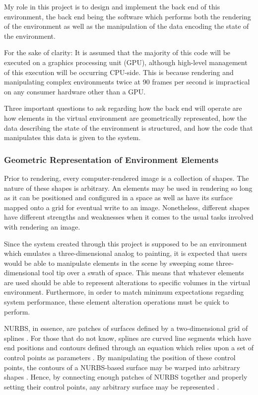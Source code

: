 \documentclass[onecolumn, draftclsnofoot,10pt, compsoc]{IEEEtran}
\newcounter{threesection}[subsubsection]
\begin{document}
My role in this project is to design and implement the back end of this environment, the back end being the software which performs both the rendering of the environment as well as the manipulation of the data encoding the state of the environment.

For the sake of clarity: It is assumed that the majority of this code will be executed on a graphics processing unit (GPU), although high-level management of this execution will be occurring CPU-side.
This is because rendering and manipulating complex environments twice at 90 frames per second is impractical on any consumer hardware other than a GPU.

Three important questions to ask regarding how the back end will operate are how elements in the virtual environment are geometrically represented, how the data describing the state of the environment is structured, and how the code that manipulates this data is given to the system.


\subsubsection{Geometric Representation of Environment Elements}

Prior to rendering, every computer-rendered image is a collection of shapes.
The nature of these shapes is arbitrary.
An elements may be used in rendering so long as it can be positioned and configured in a space as well as have its surface mapped onto a grid for eventual write to an image.
Nonetheless, different shapes have different strengths and weaknesses when it comes to the usual tasks involved with rendering an image.


Since the system created through this project is supposed to be an environment which emulates a three-dimensional analog to painting, it is expected that users would be able to manipulate elements in the scene by sweeping some three-dimensional tool tip over a swath of space. This means that whatever elements are used should be able to represent alterations to specific volumes in the virtual environment. Furthermore, in order to match minimum expectations regarding system performance, these element alteration operations must be quick to perform.


NURBS, in essence, are patches of surfaces defined by a two-dimensional grid of splines \cite{1}\cite{2}.
For those that do not know, splines are curved line segments which have end positions and contours defined through an equation which relies upon a set of control points as parameters \cite{1}\cite{2}.
By manipulating the position of these control points, the contours of a NURBS-based surface may be warped into arbitrary shapes \cite{1}\cite{2}.
Hence, by connecting enough patches of NURBS together and properly setting their control points, any arbitrary surface may be represented \cite{1}\cite{2}.
\end{document}
